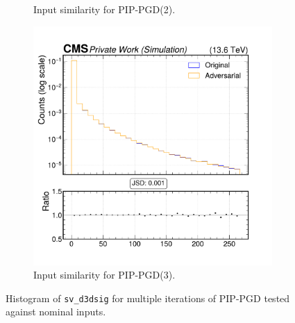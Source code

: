 \begin{figure}[h]
\begin{subfigure}[t]{0.32\textwidth}
    \caption*{Input similarity for PIP-PGD(2).}
  \end{subfigure}\hfill
  \begin{subfigure}[t]{0.32\textwidth}
    \includegraphics[width=\linewidth]{media/output/features/compare/combined_it_3/cmp_vtx_arr_sv_d3dsig.pdf}
    \caption*{Input similarity for PIP-PGD(3).}
  \end{subfigure}

  \caption*{Histogram of \texttt{sv\_d3dsig} for multiple iterations of PIP-PGD tested against nominal inputs.}
  \label{fig:combined_input_sv_d3dsig}
\end{figure}


